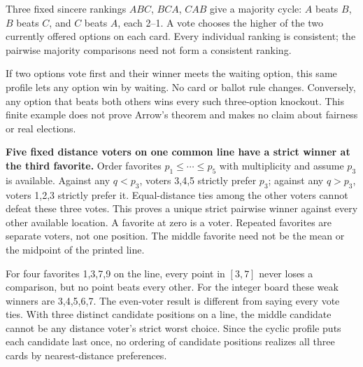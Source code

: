 Three fixed sincere rankings $ABC$, $BCA$, $CAB$ give a majority cycle: $A$ beats $B$, $B$ beats $C$, and $C$ beats $A$, each 2--1. A vote chooses the higher of the two currently offered options on each card. Every individual ranking is consistent; the pairwise majority comparisons need not form a consistent ranking.

If two options vote first and their winner meets the waiting option, this same profile lets any option win by waiting. No card or ballot rule changes. Conversely, any option that beats both others wins every such three-option knockout. This finite example does not prove Arrow's theorem and makes no claim about fairness or real elections.

\textbf{Five fixed distance voters on one common line have a strict winner at the third favorite.} Order favorites $p_1\leq\cdots\leq p_5$ with multiplicity and assume $p_3$ is available. Against any $q<p_3$, voters 3,4,5 strictly prefer $p_3$; against any $q>p_3$, voters 1,2,3 strictly prefer it. Equal-distance ties among the other voters cannot defeat these three votes. This proves a unique strict pairwise winner against every other available location. A favorite at zero is a voter. Repeated favorites are separate voters, not one position. The middle favorite need not be the mean or the midpoint of the printed line.

For four favorites 1,3,7,9 on the line, every point in $[3,7]$ never loses a comparison, but no point beats every other. For the integer board these weak winners are 3,4,5,6,7. The even-voter result is different from saying every vote ties. With three distinct candidate positions on a line, the middle candidate cannot be any distance voter's strict worst choice. Since the cyclic profile puts each candidate last once, no ordering of candidate positions realizes all three cards by nearest-distance preferences.
